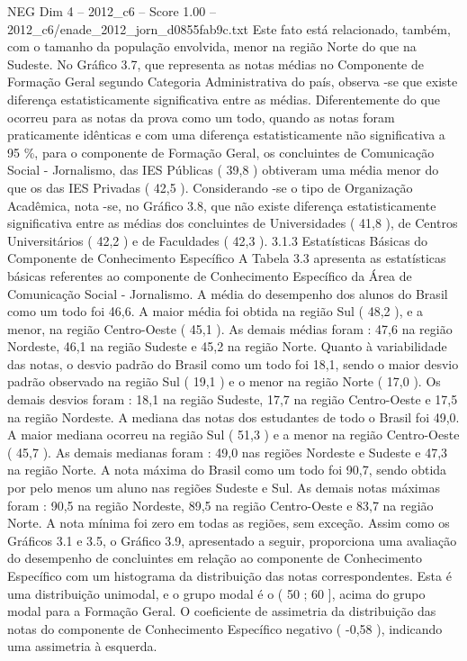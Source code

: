\begin{textsample}{NEG Dim 4 – 2012\_c6 – Score 1.00 – 2012\_c6/enade\_2012\_jorn\_d0855fab9c.txt}
Este fato está relacionado, também, com o tamanho da população envolvida, menor na região Norte do que na Sudeste.
No Gráfico 3.7, que representa as notas médias no Componente de Formação Geral segundo Categoria Administrativa do país, observa -se que existe diferença estatisticamente significativa entre as médias.
Diferentemente do que ocorreu para as notas da prova como um todo, quando as notas foram praticamente idênticas e com uma diferença estatisticamente não significativa a 95 \%, para o componente de Formação Geral, os concluintes de Comunicação Social - Jornalismo, das IES Públicas ( 39,8 ) obtiveram uma média menor do que os das IES Privadas ( 42,5 ).
Considerando -se o tipo de Organização Acadêmica, nota -se, no Gráfico 3.8, que não existe diferença estatisticamente significativa entre as médias dos concluintes de Universidades ( 41,8 ), de Centros Universitários ( 42,2 ) e de Faculdades ( 42,3 ). 3.1.3 Estatísticas Básicas do Componente de Conhecimento Específico A Tabela 3.3 apresenta as estatísticas básicas referentes ao componente de Conhecimento Específico da Área de Comunicação Social - Jornalismo.
A média do desempenho dos alunos do Brasil como um todo foi 46,6.
A maior média foi obtida na região Sul ( 48,2 ), e a menor, na região Centro-Oeste ( 45,1 ).
As demais médias foram : 47,6 na região Nordeste, 46,1 na região Sudeste e 45,2 na região Norte.
Quanto à variabilidade das notas, o desvio padrão do Brasil como um todo foi 18,1, sendo o maior desvio padrão observado na região Sul ( 19,1 ) e o menor na região Norte ( 17,0 ).
Os demais desvios foram : 18,1 na região Sudeste, 17,7 na região Centro-Oeste e 17,5 na região Nordeste.
A mediana das notas dos estudantes de todo o Brasil foi 49,0.
A maior mediana ocorreu na região Sul ( 51,3 ) e a menor na região Centro-Oeste ( 45,7 ).
As demais medianas foram : 49,0 nas regiões Nordeste e Sudeste e 47,3 na região Norte.
A nota máxima do Brasil como um todo foi 90,7, sendo obtida por pelo menos um aluno nas regiões Sudeste e Sul.
As demais notas máximas foram : 90,5 na região Nordeste, 89,5 na região Centro-Oeste e 83,7 na região Norte.
A nota mínima foi zero em todas as regiões, sem exceção.
Assim como os Gráficos 3.1 e 3.5, o Gráfico 3.9, apresentado a seguir, proporciona uma avaliação do desempenho de concluintes em relação ao componente de Conhecimento Específico com um histograma da distribuição das notas correspondentes.
Esta é uma distribuição unimodal, e o grupo modal é o ( 50 ; 60 ], acima do grupo modal para a Formação Geral.
O coeficiente de assimetria da distribuição das notas do componente de Conhecimento Específico negativo ( -0,58 ), indicando uma assimetria à esquerda.

\end{textsample}
